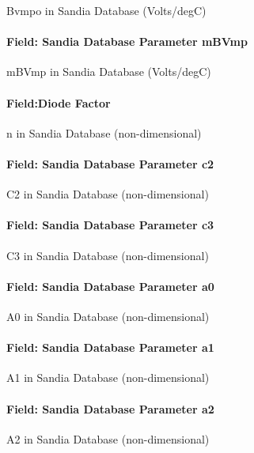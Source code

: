 Bvmpo in Sandia Database (Volts/degC)

\paragraph{Field: Sandia Database Parameter mBVmp}\label{field-sandia-database-parameter-mbvmp}

mBVmp in Sandia Database (Volts/degC)

\paragraph{Field:Diode Factor}\label{fielddiode-factor}

n in Sandia Database (non-dimensional)

\paragraph{Field: Sandia Database Parameter c2}\label{field-sandia-database-parameter-c2}

C2 in Sandia Database (non-dimensional)

\paragraph{Field: Sandia Database Parameter c3}\label{field-sandia-database-parameter-c3}

C3 in Sandia Database (non-dimensional)

\paragraph{Field: Sandia Database Parameter a0}\label{field-sandia-database-parameter-a0}

A0 in Sandia Database (non-dimensional)

\paragraph{Field: Sandia Database Parameter a1}\label{field-sandia-database-parameter-a1}

A1 in Sandia Database (non-dimensional)

\paragraph{Field: Sandia Database Parameter a2}\label{field-sandia-database-parameter-a2}

A2 in Sandia Database (non-dimensional)

